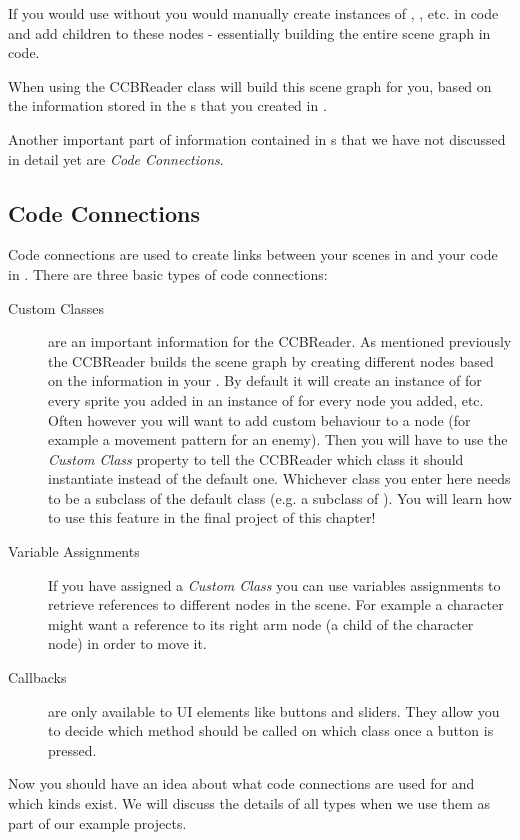 If you would use \cocos{} without \SB{} you would manually create instances of
\ccnode{}, \ccsprite{}, etc. in code and add children to these nodes -
essentially building the entire scene graph in code.

When using \SB{} the CCBReader class will build this scene graph for you, based
on the information stored in the \ccbfile{}s that you created in \SB{}.

Another important part of information contained in \ccbfile{}s that we have not
discussed in detail yet are \textit{Code Connections}.

\subsection{Code Connections}
Code connections are used to create links between your scenes in \SB{} and your
code in \xcode{}. There are three basic types of code connections:
\begin{description}
\item[Custom Classes] are an important information for the CCBReader. As
mentioned previously the CCBReader builds the scene graph by creating different
nodes based on the information in your \ccbfile{}. By default it will create an
instance of \ccsprite{} for every sprite you added in \SB{} an instance of \ccnode{} for every node you added, etc. Often
however you will want to add custom behaviour to a node (for example a movement
pattern for an enemy). Then you will have to use the \textit{Custom Class}
property to tell the CCBReader which class it should instantiate instead of the
default one. Whichever class you enter here needs to be a subclass of the
default class (e.g. a subclass of \ccsprite{}). You will learn how to use this
feature in the final project of this chapter!
\item[Variable Assignments] If you have assigned a \textit{Custom Class} you can
use variables assignments to retrieve references to different nodes in the
scene. For example a character might want a reference to its right arm node (a
child of the character node) in order to move it. 
\item[Callbacks] are only available to UI elements like buttons and sliders.
They allow you to decide which method should be called on which class once a
button is pressed.
\end{description}
Now you should have an idea about what code connections are used for and which
kinds exist. We will discuss the details of all types when we use them as part
of our example projects.

